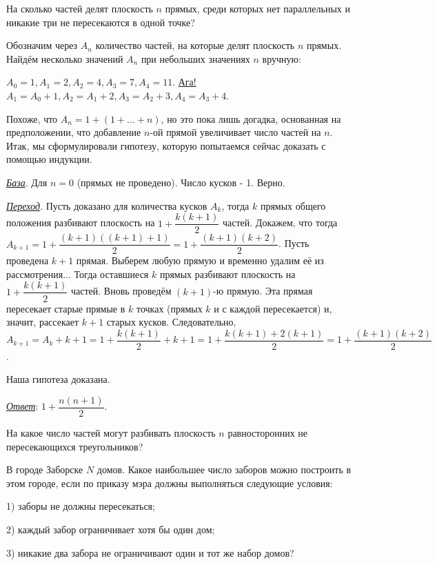 \begin{thm}
На сколько частей делят плоскость $n$ прямых, среди которых нет параллельных и никакие три не пересекаются в одной точке?\footnotemark
\end{thm}

\begin{prf}
    Обозначим через $A_n$ количество частей, на которые делят плоскость $n$ прямых. Найдём несколько значений $A_n$ при небольших значениях $n$ вручную:
    \par
    $A_0 = 1, A_1 = 2, A_2 = 4, A_3 = 7, A_4 = 11$. \underline {Ага!} $A_1 = A_0 + 1, A_2 = A_1 + 2, A_3 = A_2 + 3, A_4 = A_3 + 4$.
    \par
    Похоже, что $A_n = 1 + (1 + ... + n)$, но это пока лишь догадка, основанная на предположении, что добавление $n$-ой прямой увеличивает число частей на $n$. Итак, мы сформулировали гипотезу, которую попытаемся сейчас доказать с помощью индукции.  
    
    \textit{\underline{База}}. Для $n = 0$ (прямых не проведено). Число кусков - 1. Верно.
    \par
    \textit{\underline{Переход}}. Пусть доказано для количества кусков $A_k$, тогда $k$ прямых общего положения разбивают плоскость на $1 + \dfrac{k(k + 1)}{2}$ частей. Докажем, что тогда $A_{k+1} = 1 + \dfrac{(k + 1)((k + 1) + 1)}{2} = 1 + \dfrac{(k + 1)(k + 2)}{2}$. Пусть проведена $k + 1$ прямая. Выберем любую прямую и временно удалим её из рассмотрения... Тогда оставшиеся $k$ прямых разбивают плоскость на $1 + \dfrac{k(k + 1)}{2}$ частей. Вновь проведём $(k + 1)$-ю прямую. Эта прямая пересекает старые прямые в $k$ точках (прямых $k$ и с каждой пересекается) и, значит, рассекает $k + 1$ старых кусков. 
    Следовательно, $A_{k + 1} = A_k + k + 1 = 1 + \dfrac{k(k + 1)}{2} + k + 1 = 1 + \dfrac{k(k + 1) + 2(k + 1)}{2} = 1 + \dfrac{(k + 1)(k + 2)}{2}$. 
    \par
    Наша гипотеза доказана.
    \par
    \textit{\underline{Ответ}}: $1 + \dfrac{n(n + 1)}{2}$. \end{prf}

\begin{thm}
    На какое число частей могут разбивать плоскость $n$ равносторонних не пересекающихся треугольников?
\end{thm}

\begin{thm}\label{thm6_1}
    В городе Заборске $N$ домов. Какое наибольшее число заборов можно построить в этом городе, если по приказу мэра должны выполняться следующие условия:
    \par
        1) заборы не должны пересекаться;
        \par
        2) каждый забор ограничивает хотя бы один дом;
        \par
        3) никакие два забора не ограничивают один и тот же набор домов?
\end{thm}

